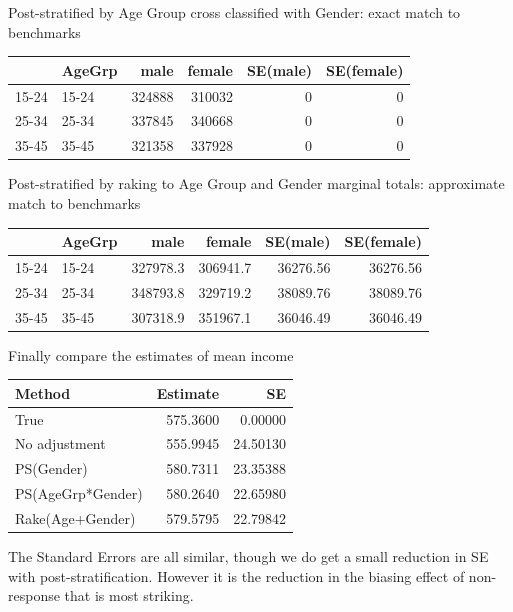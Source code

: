 \documentclass[
]{book}
\begin{document}
Post-stratified by Age Group cross classified with Gender: exact match to benchmarks

\begin{table}
\centering
\begin{tabular}[t]{l|l|r|r|r|r}
\hline
  & AgeGrp & male & female & SE(male) & SE(female)\\
\hline
15-24 & 15-24 & 324888 & 310032 & 0 & 0\\
\hline
25-34 & 25-34 & 337845 & 340668 & 0 & 0\\
\hline
35-45 & 35-45 & 321358 & 337928 & 0 & 0\\
\hline
\end{tabular}
\end{table}

Post-stratified by raking to Age Group and Gender marginal totals: approximate
match to benchmarks

\begin{table}
\centering
\begin{tabular}[t]{l|l|r|r|r|r}
\hline
  & AgeGrp & male & female & SE(male) & SE(female)\\
\hline
15-24 & 15-24 & 327978.3 & 306941.7 & 36276.56 & 36276.56\\
\hline
25-34 & 25-34 & 348793.8 & 329719.2 & 38089.76 & 38089.76\\
\hline
35-45 & 35-45 & 307318.9 & 351967.1 & 36046.49 & 36046.49\\
\hline
\end{tabular}
\end{table}

Finally compare the estimates of mean income

\begin{table}
\centering
\begin{tabular}[t]{l|r|r}
\hline
Method & Estimate & SE\\
\hline
True & 575.3600 & 0.00000\\
\hline
No adjustment & 555.9945 & 24.50130\\
\hline
PS(Gender) & 580.7311 & 23.35388\\
\hline
PS(AgeGrp*Gender) & 580.2640 & 22.65980\\
\hline
Rake(Age+Gender) & 579.5795 & 22.79842\\
\hline
\end{tabular}
\end{table}

The Standard Errors are all similar, though we do get a small reduction in SE
with post-stratification. However it is the reduction in the biasing
effect of non-response that is most striking.
\end{document}

